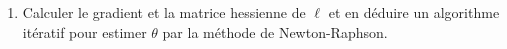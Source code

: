 \documentclass[a4paper,10pt,fleqn]{article}
\newcommand{\1}{\ensuremath{\mathbbm{1}}}
\begin{document}
\begin{enumerate}
\item Calculer le gradient et la matrice hessienne de $\ell$ et en d\'eduire un algorithme it\'eratif pour estimer $\theta$ par la m\'ethode de  Newton-Raphson.

%
%
\end{enumerate}
\end{document}
